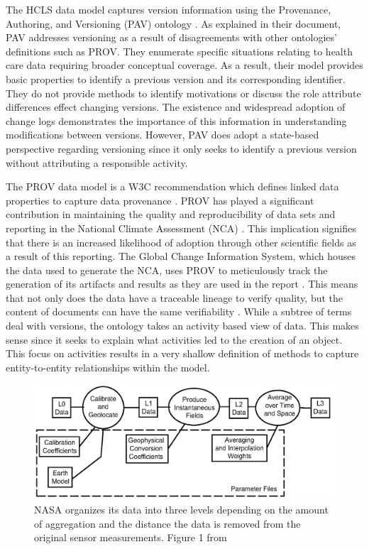 The HCLS data model captures version information using the Provenance, Authoring, and Versioning (PAV) ontology \cite{Ciccarese2013}.
As explained in their document, PAV addresses versioning as a result of disagreements with other ontologies' definitions such as PROV.
They enumerate specific situations relating to health care data requiring broader conceptual coverage.
As a result, their model provides basic properties to identify a previous version and its corresponding identifier.
They do not provide methods to identify motivations or discuss the role attribute differences effect changing versions.
The existence and widespread adoption of change logs demonstrates the importance of this information in understanding modifications between versions.
However, PAV does adopt a state-based perspective regarding versioning since it only seeks to identify a previous version without attributing a responsible activity.

The PROV data model is a W3C recommendation which defines linked data properties to capture data provenance \cite{Gil2013}.
PROV has played a significant contribution in maintaining the quality and reproducibility of data sets and reporting in the National Climate Assessment (NCA) \cite{Ma2014191}.
This implication signifies that there is an increased likelihood of adoption through other scientific fields as a result of this reporting.
The Global Change Information System, which houses the data used to generate the NCA, uses PROV to meticulously track the generation of its artifacts and results as they are used in the report \cite{Tilmes2012}.
This means that not only does the data have a traceable lineage to verify quality, but the content of documents can have the same verifiability \cite{Ma2014}.
While a subtree of terms deal with versions, the ontology takes an activity based view of data.
This makes sense since it seeks to explain what activities led to the creation of an object.
This focus on activities results in a very shallow definition of methods to capture entity-to-entity relationships within the model.

\begin{figure}
	\centering
	\includegraphics[scale=0.35]{figures/NASALevels.png}
	\caption[NASA organizes its data into three levels depending on the amount of aggregation and the distance the data is removed from the original sensor measurements.]{NASA organizes its data into three levels depending on the amount of aggregation and the distance the data is removed from the original sensor measurements. Figure 1 from \cite{Barkstrom2003}}
	\label{NASALevels}
\end{figure}

